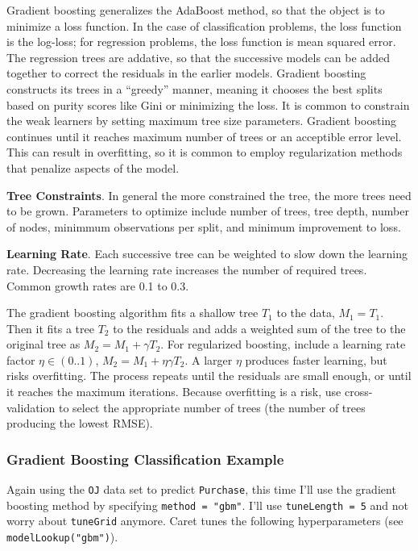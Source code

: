 \documentclass[]{book}
\begin{document}
Gradient boosting generalizes the AdaBoost method, so that the object is to minimize a loss function. In the case of classification problems, the loss function is the log-loss; for regression problems, the loss function is mean squared error. The regression trees are addative, so that the successive models can be added together to correct the residuals in the earlier models. Gradient boosting constructs its trees in a ``greedy'' manner, meaning it chooses the best splits based on purity scores like Gini or minimizing the loss. It is common to constrain the weak learners by setting maximum tree size parameters. Gradient boosting continues until it reaches maximum number of trees or an acceptible error level. This can result in overfitting, so it is common to employ regularization methods that penalize aspects of the model.

\textbf{Tree Constraints}. In general the more constrained the tree, the more trees need to be grown. Parameters to optimize include number of trees, tree depth, number of nodes, minimmum observations per split, and minimum improvement to loss.

\textbf{Learning Rate}. Each successive tree can be weighted to slow down the learning rate. Decreasing the learning rate increases the number of required trees. Common growth rates are 0.1 to 0.3.

The gradient boosting algorithm fits a shallow tree \(T_1\) to the data, \(M_1 = T_1\). Then it fits a tree \(T_2\) to the residuals and adds a weighted sum of the tree to the original tree as \(M_2 = M_1 + \gamma T_2\). For regularized boosting, include a learning rate factor \(\eta \in (0..1)\), \(M_2 = M_1 + \eta \gamma T_2\). A larger \(\eta\) produces faster learning, but risks overfitting. The process repeats until the residuals are small enough, or until it reaches the maximum iterations. Because overfitting is a risk, use cross-validation to select the appropriate number of trees (the number of trees producing the lowest RMSE).

\hypertarget{gradient-boosting-classification-example}{%
\subsubsection{Gradient Boosting Classification Example}\label{gradient-boosting-classification-example}}

Again using the \texttt{OJ} data set to predict \texttt{Purchase}, this time I'll use the gradient boosting method by specifying \texttt{method\ =\ "gbm"}. I'll use \texttt{tuneLength\ =\ 5} and not worry about \texttt{tuneGrid} anymore. Caret tunes the following hyperparameters (see \texttt{modelLookup("gbm")}).
\end{document}
